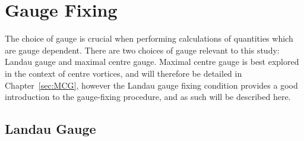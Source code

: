 \section{Gauge Fixing}
The choice of gauge is crucial when performing calculations of quantities which are gauge dependent. There are two choices of gauge relevant to this study: Landau gauge and maximal centre gauge. Maximal centre gauge is best explored in the context of centre vortices, and will therefore be detailed in Chapter~\ref{sec:MCG}, however the Landau gauge fixing condition provides a good introduction to the gauge-fixing procedure, and as such will be described here.

\subsection{Landau Gauge}\label{sec:LandauGauge}

